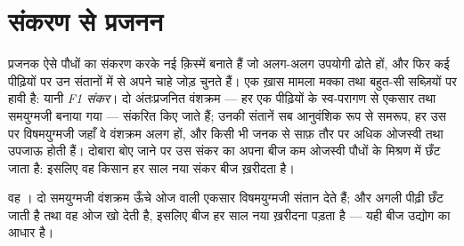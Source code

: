 \section{संकरण से प्रजनन}

\begin{proposition}[क़िस्में और संकर]\label{prop:g12:domesticated-plants:hybrids}
प्रजनक ऐसे पौधों का संकरण करके नई क़िस्में बनाते हैं जो अलग-अलग उपयोगी
 ढोते हों, और फिर कई पीढ़ियों पर उन संतानों में से अपने चाहे
जोड़ चुनते हैं। एक ख़ास मामला मक्का तथा बहुत-सी सब्ज़ियों पर हावी है: यानी
\emph{F1 संकर}। दो अंतःप्रजनित वंशक्रम --- हर एक पीढ़ियों के
स्व-परागण से एकसार तथा समयुग्मजी बनाया गया --- संकरित किए जाते हैं; उनकी
संतानें सब आनुवंशिक रूप से समरूप, हर उस  पर विषमयुग्मजी जहाँ वे वंशक्रम
अलग हों, और किसी भी जनक से साफ़ तौर पर अधिक ओजस्वी तथा उपजाऊ होती हैं।
दोबारा बोए जाने पर उस संकर का अपना बीज कम ओजस्वी पौधों के मिश्रण में छँट
जाता है: इसलिए वह किसान हर साल नया संकर बीज ख़रीदता है।
\end{proposition}
\admitted

\begin{omfigure}

{\small वह । दो समयुग्मजी वंशक्रम ऊँचे ओज वाली एकसार विषमयुग्मजी
संतान देते हैं; और अगली पीढ़ी छँट जाती है तथा वह ओज खो देती है, इसलिए बीज हर
साल नया ख़रीदना पड़ता है --- यही बीज उद्योग का आधार है।}
\end{omfigure}


